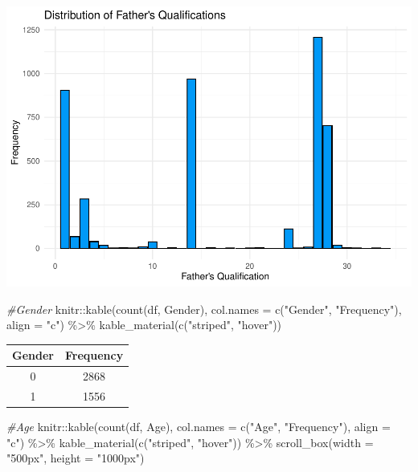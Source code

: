\documentclass[
]{article}
\newenvironment{Shaded}{\begin{snugshade}}{\end{snugshade}}
\newcommand{\AttributeTok}[1]{\textcolor[rgb]{0.77,0.63,0.00}{#1}}
\newcommand{\CommentTok}[1]{\textcolor[rgb]{0.56,0.35,0.01}{\textit{#1}}}
\newcommand{\FunctionTok}[1]{\textcolor[rgb]{0.00,0.00,0.00}{#1}}
\newcommand{\NormalTok}[1]{#1}
\newcommand{\SpecialCharTok}[1]{\textcolor[rgb]{0.00,0.00,0.00}{#1}}
\newcommand{\StringTok}[1]{\textcolor[rgb]{0.31,0.60,0.02}{#1}}
\begin{document}
\includegraphics{midterm_files/figure-latex/unnamed-chunk-10-1.pdf}

\begin{Shaded}
\begin{Highlighting}[]
\CommentTok{\#Gender}
\NormalTok{knitr}\SpecialCharTok{::}\FunctionTok{kable}\NormalTok{(}\FunctionTok{count}\NormalTok{(df, }\StringTok{\textquotesingle{}Gender\textquotesingle{}}\NormalTok{), }\AttributeTok{col.names =} \FunctionTok{c}\NormalTok{(}\StringTok{"Gender"}\NormalTok{, }\StringTok{"Frequency"}\NormalTok{), }\AttributeTok{align =} \StringTok{"c"}\NormalTok{) }\SpecialCharTok{\%\textgreater{}\%}
  \FunctionTok{kable\_material}\NormalTok{(}\FunctionTok{c}\NormalTok{(}\StringTok{"striped"}\NormalTok{, }\StringTok{"hover"}\NormalTok{))}
\end{Highlighting}
\end{Shaded}

\begin{table}
\centering
\begin{tabular}{c|c}
\hline
Gender & Frequency\\
\hline
0 & 2868\\
\hline
1 & 1556\\
\hline
\end{tabular}
\end{table}

\begin{Shaded}
\begin{Highlighting}[]
\CommentTok{\#Age}
\NormalTok{knitr}\SpecialCharTok{::}\FunctionTok{kable}\NormalTok{(}\FunctionTok{count}\NormalTok{(df, }\StringTok{\textquotesingle{}Age\textquotesingle{}}\NormalTok{), }\AttributeTok{col.names =} \FunctionTok{c}\NormalTok{(}\StringTok{"Age"}\NormalTok{, }\StringTok{"Frequency"}\NormalTok{), }\AttributeTok{align =} \StringTok{"c"}\NormalTok{) }\SpecialCharTok{\%\textgreater{}\%}
  \FunctionTok{kable\_material}\NormalTok{(}\FunctionTok{c}\NormalTok{(}\StringTok{"striped"}\NormalTok{, }\StringTok{"hover"}\NormalTok{)) }\SpecialCharTok{\%\textgreater{}\%} 
 \FunctionTok{scroll\_box}\NormalTok{(}\AttributeTok{width =} \StringTok{"500px"}\NormalTok{, }\AttributeTok{height =} \StringTok{"1000px"}\NormalTok{)}
\end{Highlighting}
\end{Shaded}
\end{document}

